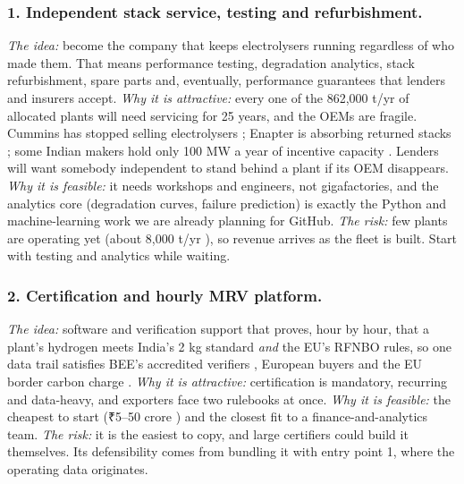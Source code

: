 \subsubsection{1. Independent stack service, testing and refurbishment.}
\emph{The idea:} become the company that keeps electrolysers running regardless of who made them. That means performance testing, degradation analytics, stack refurbishment, spare parts and, eventually, performance guarantees that lenders and insurers accept.
\emph{Why it is attractive:} every one of the 862,000 t/yr of allocated plants \cite{sqnghm2025} will need servicing for 25 years, and the OEMs are fragile. Cummins has stopped selling electrolysers \cite{argus2026}; Enapter is absorbing returned stacks \cite{enapter2026}; some Indian makers hold only 100 MW a year of incentive capacity \cite{secipli2024}. Lenders will want somebody independent to stand behind a plant if its OEM disappears.
\emph{Why it is feasible:} it needs workshops and engineers, not gigafactories, and the analytics core (degradation curves, failure prediction) is exactly the Python and machine-learning work we are already planning for GitHub.
\emph{The risk:} few plants are operating yet (about 8,000 t/yr \cite{chemindigest2026}), so revenue arrives as the fleet is built. Start with testing and analytics while waiting. \confM

\subsubsection{2. Certification and hourly MRV platform.}
\emph{The idea:} software and verification support that proves, hour by hour, that a plant's hydrogen meets India's 2 kg standard \cite{drishti2023} \emph{and} the EU's RFNBO rules, so one data trail satisfies BEE's accredited verifiers \cite{ghci2025}, European buyers \cite{amgreenuniper2026} and the EU border carbon charge \cite{coolset}.
\emph{Why it is attractive:} certification is mandatory, recurring and data-heavy, and exporters face two rulebooks at once.
\emph{Why it is feasible:} the cheapest to start (₹5–50 crore \estd) and the closest fit to a finance-and-analytics team.
\emph{The risk:} it is the easiest to copy, and large certifiers could build it themselves. Its defensibility comes from bundling it with entry point 1, where the operating data originates. \confM

